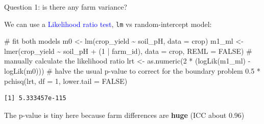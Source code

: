 \documentclass[
  ignorenonframetext,
  aspectratio=169,
]{beamer}
\newenvironment{Shaded}{\begin{snugshade}}{\end{snugshade}}
\newcommand{\AttributeTok}[1]{\textcolor[rgb]{0.40,0.45,0.13}{#1}}
\newcommand{\CommentTok}[1]{\textcolor[rgb]{0.37,0.37,0.37}{#1}}
\newcommand{\ConstantTok}[1]{\textcolor[rgb]{0.56,0.35,0.01}{#1}}
\newcommand{\DecValTok}[1]{\textcolor[rgb]{0.68,0.00,0.00}{#1}}
\newcommand{\FloatTok}[1]{\textcolor[rgb]{0.68,0.00,0.00}{#1}}
\newcommand{\FunctionTok}[1]{\textcolor[rgb]{0.28,0.35,0.67}{#1}}
\newcommand{\NormalTok}[1]{\textcolor[rgb]{0.00,0.23,0.31}{#1}}
\newcommand{\OtherTok}[1]{\textcolor[rgb]{0.00,0.23,0.31}{#1}}
\newcommand{\SpecialCharTok}[1]{\textcolor[rgb]{0.37,0.37,0.37}{#1}}
\begin{document}
\begin{frame}[fragile]{Question 1: is there any farm variance?}
\label{question-1-is-there-any-farm-variance}
\small

We can use a \textcolor{blue}{Likelihood ratio test}, \texttt{lm} vs
random-intercept model:

\begin{Shaded}
\begin{Highlighting}[]
\CommentTok{\# fit both models}
\NormalTok{m0 }\OtherTok{\textless{}{-}} \FunctionTok{lm}\NormalTok{(crop\_yield }\SpecialCharTok{\textasciitilde{}}\NormalTok{ soil\_pH, }\AttributeTok{data =}\NormalTok{ crop)}
\NormalTok{m1\_ml }\OtherTok{\textless{}{-}} \FunctionTok{lmer}\NormalTok{(crop\_yield }\SpecialCharTok{\textasciitilde{}}\NormalTok{ soil\_pH }\SpecialCharTok{+}\NormalTok{ (}\DecValTok{1} \SpecialCharTok{|}\NormalTok{ farm\_id),}
              \AttributeTok{data =}\NormalTok{ crop, }\AttributeTok{REML =} \ConstantTok{FALSE}\NormalTok{)}
\CommentTok{\# manually calculate the likelihood ratio}
\NormalTok{lrt }\OtherTok{\textless{}{-}} \FunctionTok{as.numeric}\NormalTok{(}\DecValTok{2} \SpecialCharTok{*}\NormalTok{ (}\FunctionTok{logLik}\NormalTok{(m1\_ml) }\SpecialCharTok{{-}} \FunctionTok{logLik}\NormalTok{(m0)))}
\CommentTok{\# halve the usual p{-}value to correct for the boundary problem}
\FloatTok{0.5} \SpecialCharTok{*} \FunctionTok{pchisq}\NormalTok{(lrt, }\AttributeTok{df =} \DecValTok{1}\NormalTok{, }\AttributeTok{lower.tail =} \ConstantTok{FALSE}\NormalTok{)}
\end{Highlighting}
\end{Shaded}

\pause

\begin{verbatim}
[1] 5.333457e-115
\end{verbatim}

\pause

The p-value is tiny here because farm differences are \textbf{huge} (ICC
about 0.96)
\end{frame}
\end{document}
